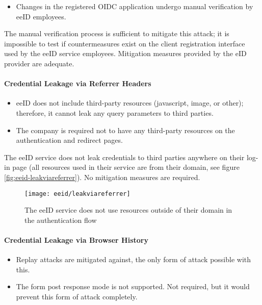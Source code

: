 \begin{itemize}
  \item Changes in the registered OIDC application undergo manual verification by eeID employees.
\end{itemize}

The manual verification process is sufficient to mitigate this attack; it is impossible to test if countermeasures exist on the client registration interface used by the eeID service employees. Mitigation measures provided by the eID provider are adequate.

\paragraph{Credential Leakage via Referrer Headers}

\begin{itemize}
  \item eeID does not include third-party resources (javascript, image, or other); therefore, it cannot leak any query parameters to third parties.
  \item The company is required not to have any third-party resources on the authentication and redirect pages.
\end{itemize}

The eeID service does not leak credentials to third parties anywhere on their log-in page (all resources used in their service are from their domain, see figure \ref{fig:eeid-leakviareferrer}). No mitigation measures are required.

\begin{figure}
  \centering
  \texttt{[image: eeid/leakviareferrer]}
  \caption{The eeID service does not use resources outside of their domain in the authentication flow}
  \label{fig:eeid-leakviabrowser}
\end{figure}

\paragraph{Credential Leakage via Browser History}

\begin{itemize}
  \item Replay attacks are mitigated against, the only form of attack possible with this.
  \item The {form post} response mode is not supported. Not required, but it would prevent this form of attack completely.
\end{itemize}

